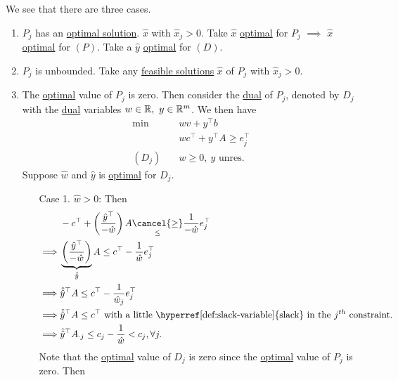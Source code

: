 \begin{explanation}
	We see that there are three cases.
	\begin{enumerate}
		\item \(P_{j}\) has an \hyperref[def:optimal-solution]{optimal solution}. \(\hat{x}\) with \(\hat{x}_j>0\). Take \(\hat{x}\) \hyperref[def:optimal-solution]{optimal}
		      for \(P_{j}\) \(\implies\) \(\hat{x}\) \hyperref[def:optimal-solution]{optimal} for \((P)\). Take a \(\hat{y}\) \hyperref[def:optimal-solution]{optimal} for \((D)\).
		\item \(P_{j}\) is unbounded. Take any \hyperref[def:feasible-solution]{feasible solutions} \(\hat{x}\) of \(P_{j}\) with \(\hat{x}_j>0\).
		\item The \hyperref[def:optimal-solution]{optimal} value of \(P_{j}\) is zero. Then consider the \hyperref[def:dual]{dual} of \(P_{j}\),
		      denoted by \(D_{j}\) with the \hyperref[def:dual]{dual} variables \(w\in\mathbb{\MakeUppercase{R}},\ y\in\mathbb{\MakeUppercase{R}}^m\).
		      We then have
		      \begin{align*}
			      \min~        & wv + y^{\top}b                        \\
			                   & wc^{\top}+y^{\top}A \geq e_{j}^{\top} \\
			      (D_{j})\quad & w\geq 0,\ y \text{ unres.}
		      \end{align*}
		      Suppose \(\hat{w}\) and \(\hat{y}\) is \hyperref[def:optimal-solution]{optimal} for \(D_{j}\).
		      \begin{enumerate}
			      \item[Case 1.] \(\hat{w}>0\): Then
				      \[
					      \begin{split}
						      &-c^{\top} + \left( \frac{\hat{y}^{\top}}{-\hat{w}} \right)A\underset{\leq }{\cancel{\geq}} \frac{1}{-\hat{w}} e_{j}^{\top}\\
						      \implies&\underbrace{\left( \frac{\hat{y}^{\top}}{-\hat{w}} \right)}_{\hat{\hat{y}}} A\leq c^{\top} -  \frac{1}{\hat{w}} e_{j}^{\top}\\
						      \implies&\hat{\hat{y}}^{\top}A\leq c^{\top} - \frac{1}{\hat{w}_j}e_{j}^{\top}\\
						      \implies&\hat{\hat{y}}^{\top}A\leq c^{\top} \text{ with a little \hyperref[def:slack-variable]{slack} in the \(j^{th}\) constraint.}\\
						      \implies&\hat{\hat{y}}^{\top}A_{\cdot j}\leq c_{j} - \frac{1}{\hat{w}}<c_{j}, \forall j.
					      \end{split}
				      \]
				      Note that the \hyperref[def:optimal-solution]{optimal} value of \(D_{j}\) is zero since the \hyperref[def:optimal-solution]{optimal} value of \(P_{j}\) is zero. Then

\end{enumerate}
\end{enumerate}
\end{explanation}
